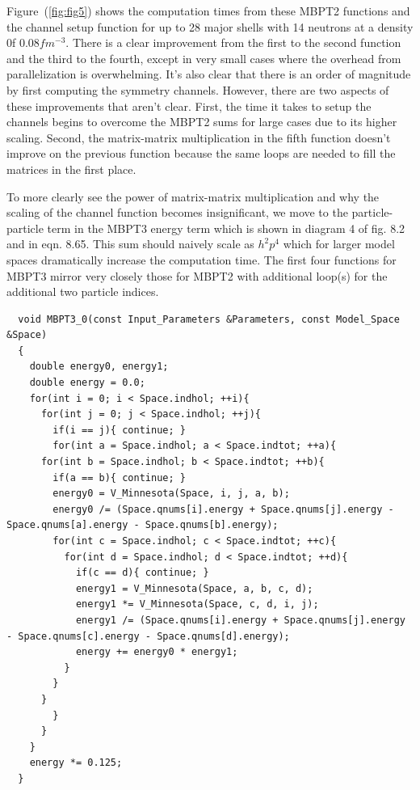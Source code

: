 Figure~(\ref{fig:fig5}) shows the computation times from these MBPT2 functions and the channel setup function for up to 28 major shells with 14 neutrons at a density 0f $0.08 fm^{-3}$. There is a clear improvement from the first to the second function and the third to the fourth, except in very small cases where the overhead from parallelization is overwhelming. It's also clear that there is an order of magnitude by first computing the symmetry channels. However, there are two aspects of these improvements that aren't clear. First, the time it takes to setup the channels begins to overcome the MBPT2 sums for large cases due to its higher scaling. Second, the matrix-matrix multiplication in the fifth function doesn't improve on the previous function because the same loops are needed to fill the matrices in the first place.

To more clearly see the power of matrix-matrix multiplication and why the scaling of the channel function becomes insignificant, we move to the particle-particle term in the MBPT3 energy term which is shown in diagram 4 of fig. 8.2 and in eqn. 8.65. This sum should naively scale as $h^2p^4$ which for larger model spaces dramatically increase the computation time. The first four functions for MBPT3 mirror very closely those for MBPT2 with additional loop(s) for the additional two particle indices.

\begin{lstlisting}
  void MBPT3_0(const Input_Parameters &Parameters, const Model_Space &Space)
  {
    double energy0, energy1;
    double energy = 0.0;
    for(int i = 0; i < Space.indhol; ++i){
      for(int j = 0; j < Space.indhol; ++j){
        if(i == j){ continue; }
        for(int a = Space.indhol; a < Space.indtot; ++a){
	  for(int b = Space.indhol; b < Space.indtot; ++b){
	    if(a == b){ continue; }
	    energy0 = V_Minnesota(Space, i, j, a, b);
	    energy0 /= (Space.qnums[i].energy + Space.qnums[j].energy - Space.qnums[a].energy - Space.qnums[b].energy);
	    for(int c = Space.indhol; c < Space.indtot; ++c){
	      for(int d = Space.indhol; d < Space.indtot; ++d){
	        if(c == d){ continue; }
	        energy1 = V_Minnesota(Space, a, b, c, d);
	        energy1 *= V_Minnesota(Space, c, d, i, j);
	        energy1 /= (Space.qnums[i].energy + Space.qnums[j].energy - Space.qnums[c].energy - Space.qnums[d].energy);
	        energy += energy0 * energy1;
	      }
	    }
	  }
        }
      }
    }
    energy *= 0.125;
  }
\end{lstlisting}

